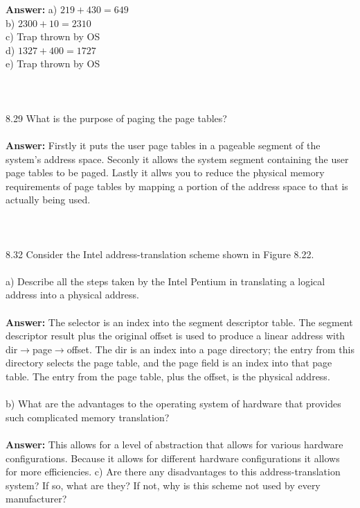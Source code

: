 \documentclass[12pt]{article}
\begin{document}
\textbf{Answer: } a) $219+430=649$\\
b) $2300+10=2310$\\
c) Trap thrown by OS\\
d) $1327+400=1727$\\
e) Trap thrown by OS
\\\\
\\\\8.29 What is the purpose of paging the page tables?\\\\
\textbf{Answer: }Firstly it puts the user page tables in a pageable segment of 
the system's address space. Seconly it allows the system segment containing the user page 
tables to be paged. Lastly it allws you to reduce the physical memory requirements of page 
tables by mapping a portion of the address space to that is actually being used.
\\\\
\\\\8.32 Consider the Intel address-translation scheme shown in Figure 8.22.\\\\
a) Describe all the steps taken by the Intel Pentium in translating a
logical address into a physical address.\\\\
\textbf{Answer: } The selector is an index into the segment descriptor table. 
The segment descriptor result plus the original offset is used to produce a linear 
address with dir$\rightarrow$page$\rightarrow$offset. The dir is an index into a page directory; 
the entry from this directory selects the page table, 
and the page field is an index into that page table. The entry from the page 
table, plus the offset, is the physical address.
\\\\
b) What are the advantages to the operating system of hardware that
provides such complicated memory translation?\\\\
\textbf{Answer: }This allows for a level of abstraction that allows for 
various hardware configurations. Because it allows for different hardware configurations 
it allows for more efficiencies.
c) Are there any disadvantages to this address-translation system? If
so, what are they? If not, why is this scheme not used by every
manufacturer?\\\\
\end{document}
